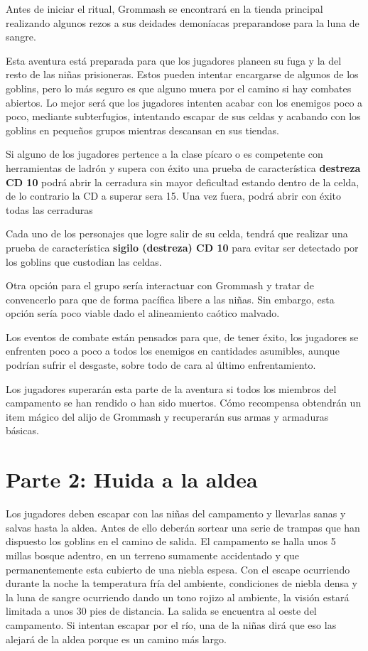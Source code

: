 \documentclass[10pt,twoside,twocolumn,openany]{dndbook}
\begin{document}
Antes de iniciar el ritual, Grommash se encontrará en la tienda principal realizando algunos
rezos a sus deidades demoníacas preparandose para la luna de sangre.

Esta aventura está preparada para que los jugadores planeen su fuga y la del resto de las niñas prisioneras. 
Estos pueden intentar encargarse de algunos de los goblins, pero lo más seguro es que alguno muera por 
el camino si hay combates abiertos. Lo mejor será que los jugadores intenten acabar con los enemigos 
poco a poco, mediante subterfugios, intentando escapar de sus celdas y acabando con los goblins en 
pequeños grupos mientras descansan en sus tiendas.

Si alguno de los jugadores pertence a la clase pícaro o es competente con herramientas de ladrón 
y supera con éxito una prueba de característica \textbf{destreza CD 10} podrá abrir la cerradura
sin mayor deficultad estando dentro de la celda, de lo contrario la CD a superar sera 15. Una vez 
fuera, podrá abrir con éxito todas las cerraduras 

Cada uno de los personajes que logre salir de su celda, tendrá que realizar una prueba de 
característica \textbf{sigilo (destreza) CD 10} para evitar ser detectado por los goblins que 
custodian las celdas.

Otra opción para el grupo sería interactuar con Grommash y tratar de convencerlo para que de forma 
pacífica libere a las niñas. Sin embargo, esta opción sería poco viable dado el alineamiento 
caótico malvado.

Los eventos de combate están pensados para que, de tener éxito, los jugadores se enfrenten poco a poco 
a todos los enemigos en cantidades asumibles, aunque podrían sufrir el desgaste, sobre todo de cara al 
último enfrentamiento.

Los jugadores superarán esta parte de la aventura si todos los miembros del campamento se han rendido 
o han sido muertos. Cómo recompensa obtendrán un item mágico del alijo de Grommash y recuperarán sus 
armas y armaduras básicas.


\section{Parte 2: Huida a la aldea}

Los jugadores deben escapar con las niñas del campamento y llevarlas sanas y salvas hasta la aldea. 
Antes de ello deberán sortear una serie de trampas que han dispuesto los goblins en el camino de salida. 
El campamento se halla unos 5 millas bosque adentro, en un terreno sumamente accidentado y que 
permanentemente esta cubierto de una niebla espesa. Con el escape ocurriendo durante la noche 
la temperatura fría del ambiente, condiciones de niebla densa y la luna de sangre ocurriendo dando 
un tono rojizo al ambiente, la visión estará limitada a unos 30 pies de distancia. La salida se 
encuentra al oeste del campamento. Si intentan escapar por el río, una de la niñas dirá que eso 
las alejará de la aldea porque es un camino más largo.
\end{document}
